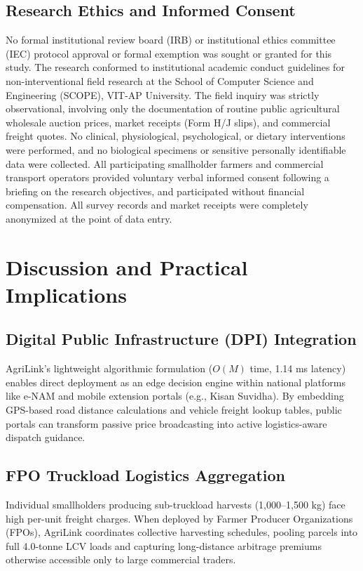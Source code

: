 \documentclass[journal]{IEEEtran}
\begin{document}
\subsection{Research Ethics and Informed Consent}
No formal institutional review board (IRB) or institutional ethics committee (IEC) protocol approval or formal exemption was sought or granted for this study. The research conformed to institutional academic conduct guidelines for non-interventional field research at the School of Computer Science and Engineering (SCOPE), VIT-AP University. The field inquiry was strictly observational, involving only the documentation of routine public agricultural wholesale auction prices, market receipts (Form H/J slips), and commercial freight quotes. No clinical, physiological, psychological, or dietary interventions were performed, and no biological specimens or sensitive personally identifiable data were collected. All participating smallholder farmers and commercial transport operators provided voluntary verbal informed consent following a briefing on the research objectives, and participated without financial compensation. All survey records and market receipts were completely anonymized at the point of data entry.

\section{Discussion and Practical Implications}
\subsection{Digital Public Infrastructure (DPI) Integration}
AgriLink's lightweight algorithmic formulation ($O(M)$ time, 1.14 ms latency) enables direct deployment as an edge decision engine within national platforms like e-NAM and mobile extension portals (e.g., Kisan Suvidha). By embedding GPS-based road distance calculations and vehicle freight lookup tables, public portals can transform passive price broadcasting into active logistics-aware dispatch guidance.

\subsection{FPO Truckload Logistics Aggregation}
Individual smallholders producing sub-truckload harvests (1,000--1,500 kg) face high per-unit freight charges. When deployed by Farmer Producer Organizations (FPOs), AgriLink coordinates collective harvesting schedules, pooling parcels into full 4.0-tonne LCV loads and capturing long-distance arbitrage premiums otherwise accessible only to large commercial traders.
\end{document}
